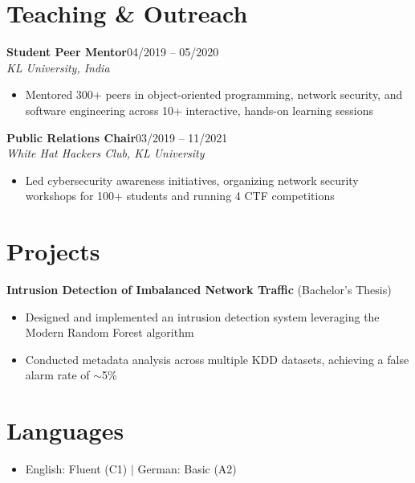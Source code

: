 \documentclass[10pt,a4paper]{article}
\newcommand{\entry}[3]{%
  \textbf{#1}\hfill{#2}\\\textit{#3}\vspace{2pt}}
\begin{document}
\section{Teaching \& Outreach}
\entry{Student Peer Mentor}{04/2019 -- 05/2020}{KL University, India}
\begin{itemize}
\item Mentored 300+ peers in object-oriented programming, network security, and software engineering across 10+ interactive, hands-on learning sessions
\end{itemize}
\vspace{4pt}
\entry{Public Relations Chair}{03/2019 -- 11/2021}{White Hat Hackers Club, KL University}
\begin{itemize}
\item Led cybersecurity awareness initiatives, organizing network security workshops for 100+ students and running 4 CTF competitions
\end{itemize}

\section{Projects}
\textbf{Intrusion Detection of Imbalanced Network Traffic} (Bachelor's Thesis)
\begin{itemize}
\item Designed and implemented an intrusion detection system leveraging the Modern Random Forest algorithm
\item Conducted metadata analysis across multiple KDD datasets, achieving a false alarm rate of $\sim$5\%
\end{itemize}


\section{Languages}
\begin{itemize}
\item English: Fluent (C1) \quad $|$ \quad German: Basic (A2)
\end{itemize}
\end{document}
